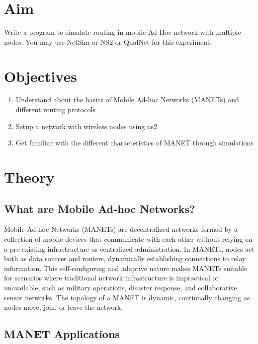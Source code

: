 \documentclass[11pt]{article}
\begin{document}
\tableofcontents
\thispagestyle{empty}
\clearpage

\setcounter{page}{1}

\section{Aim}
Write a program to simulate routing in mobile Ad-Hoc network with multiple nodes.
You may use NetSim or NS2 or QualNet for this experiment.

\section{Objectives}

\begin{enumerate}
    \item Understand about the basics of Mobile Ad-hoc Networks (MANETs) and different
          routing protocols
    \item Setup a network with wireless nodes using ns2
    \item Get familiar with the different characteristics of MANET through simulations
\end{enumerate}

\section{Theory}
\subsection{What are Mobile Ad-hoc Networks?}

Mobile Ad-hoc Networks (MANETs) are decentralized networks formed by a collection of mobile devices that communicate with each other without relying on a pre-existing infrastructure or centralized administration. In MANETs, nodes act both as data sources and routers, dynamically establishing connections to relay information. This self-configuring and adaptive nature makes MANETs suitable for scenarios where traditional network infrastructure is impractical or unavailable, such as military operations, disaster response, and collaborative sensor networks. The topology of a MANET is dynamic, continually changing as nodes move, join, or leave the network.

\subsection{MANET Applications}
\end{document}
